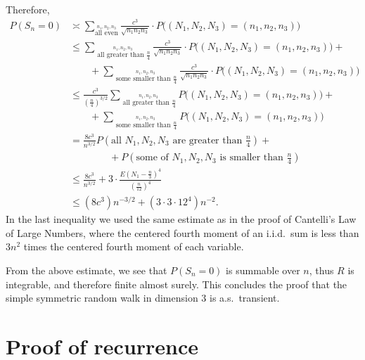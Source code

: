 \documentclass[a4paper,12pt]{article}
\theoremstyle{definition}
\renewcommand{\leq}{\leqslant}
\renewcommand{\le}{\leqslant}
\begin{document}
Therefore,
\begin{align*}
P(S_n=0)
& \asymp
\sum_{\stackrel{n_1,n_2,n_3}{\text{all even}}}
\frac{c^3}{\sqrt{n_1 n_2 n_3}}
\cdot
P\big((N_1,N_2,N_3)=(n_1,n_2,n_3)\big)
\\
& \le
\sum_{\stackrel{n_1,n_2,n_3} {\text{ all greater than }\frac{n}{4}}}
\frac{c^3}{\sqrt{n_1 n_2 n_3}}
\cdot
P\big((N_1,N_2,N_3)=(n_1,n_2,n_3)\big)
+
\\
& \qquad
+
\sum_{\stackrel{n_1,n_2,n_3} {\text{ some smaller than }\frac{n}{4}}}
\frac{c^3}{\sqrt{n_1 n_2 n_3}}
\cdot
P\big((N_1,N_2,N_3)=(n_1,n_2,n_3)\big)
\\
& \leq
\frac{c^3}{(\frac{n}{4})^{3/2}}
\sum_{\stackrel{n_1,n_2,n_3} {\text{ all greater than }\frac{n}{4}}}
P\big((N_1,N_2,N_3)=(n_1,n_2,n_3)\big)
+
\\
& \qquad +
\sum_{\stackrel{n_1,n_2,n_3} {\text{ some smaller than }\frac{n}{4}}}
P\big((N_1,N_2,N_3)=(n_1,n_2,n_3)\big)
\\
& =
\frac{8c^3}{n^{3/2}}
P(\text{all } N_1,N_2,N_3 \text{ are greater than }\tfrac{n}{4})
+
\\
& \qquad \qquad +
P(\text{some of } N_1, N_2,  N_3 \text{ is smaller than }\tfrac{n}{4})
\\
& \leq
\frac{8c^3}{n^{3/2}}
+
3 \cdot \frac{E(N_1-\frac{n}{3})^4}{(\tfrac{n}{12})^4}
\\
& \leq
(8c^3) n^{-3/2} + (3 \cdot 3 \cdot 12^4) n^{-2}
.
\end{align*}
In the last inequality we used the same estimate as in the proof of Cantelli's Law of Large Numbers, where the centered fourth moment of an i.i.d.\ sum is less than $3n^2$ times the centered fourth moment of each variable.

From the above estimate, we see that $P(S_n=0)$ is summable over $n$, thus $R$ is integrable, and therefore finite almost surely.
This concludes the proof that the simple symmetric random walk in dimension $3$ is a.s.\ transient.

\section{Proof of recurrence}
\end{document}
